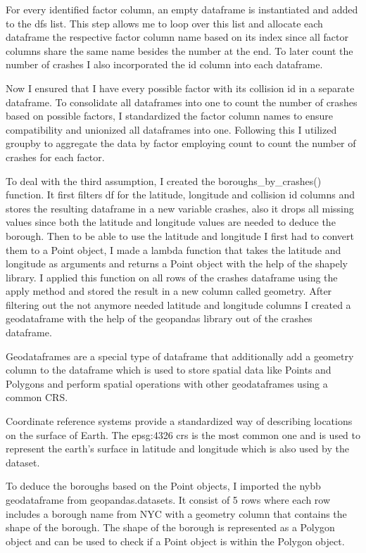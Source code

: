 \documentclass[runningheads]{llncs}
\begin{document}
For every identified factor column, an empty dataframe is instantiated and added to the dfs list.
This step allows me to loop over this list and allocate each dataframe the respective factor column name
based on its index since all factor columns share the same name besides the number at the end.
To later count the number of crashes I also incorporated the id column into each dataframe.

Now I ensured that I have every possible factor with its collision id in a separate dataframe.
To consolidate all dataframes into one to count the number of crashes based on possible factors, 
I standardized the factor column names to ensure compatibility and unionized all dataframes into one.
Following this I utilized groupby to aggregate the data by factor employing count
to count the number of crashes for each factor.

To deal with the third assumption, I created the boroughs\_by\_crashes() function.
It first filters df for the latitude, longitude and collision id columns and stores 
the resulting dataframe in a new variable crashes, also it drops all missing values
since both the latitude and longitude values are needed to deduce the borough. Then to be able to use the latitude and longitude
I first had to convert them to a Point object, I made a lambda function that takes the latitude and longitude as arguments
and returns a Point object with the help of the shapely library. I applied this function on all rows of the 
crashes dataframe using the apply method and stored the result in a new column called geometry.
After filtering out the not anymore needed latitude and longitude columns I created a geodataframe with the help of the
geopandas library out of the crashes dataframe.

Geodataframes are a special type of dataframe that additionally add a geometry column to the dataframe which is used to store spatial data
like Points and Polygons and perform spatial operations with other geodataframes using a common CRS. 

Coordinate reference systems provide a standardized way of describing locations on the surface of Earth.
The epsg:4326 crs is the most common one and is used to represent the earth's surface in latitude and longitude which 
is also used by the dataset.

To deduce the boroughs based on the Point objects, I imported the nybb geodataframe from geopandas.datasets.
It consist of 5 rows where each row includes a borough name from NYC with a geometry column that contains the shape of the borough.
The shape of the borough is represented as a Polygon object and can be used to check if a Point object is within the Polygon object.
\end{document}
